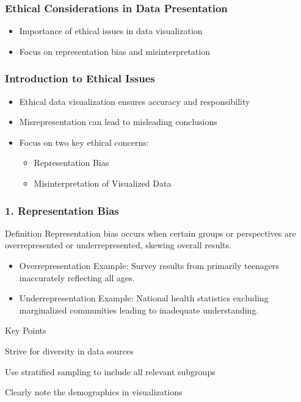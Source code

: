 \documentclass[aspectratio=169]{beamer}
\begin{document}
\begin{frame}[fragile]
    \frametitle{Ethical Considerations in Data Presentation}
    \begin{itemize}
        \item Importance of ethical issues in data visualization
        \item Focus on representation bias and misinterpretation
    \end{itemize}
\end{frame}

\begin{frame}[fragile]
    \frametitle{Introduction to Ethical Issues}
    \begin{itemize}
        \item Ethical data visualization ensures accuracy and responsibility
        \item Misrepresentation can lead to misleading conclusions
        \item Focus on two key ethical concerns:
            \begin{itemize}
                \item Representation Bias
                \item Misinterpretation of Visualized Data
            \end{itemize}
    \end{itemize}
\end{frame}

\begin{frame}[fragile]
    \frametitle{1. Representation Bias}
    \begin{block}{Definition}
        Representation bias occurs when certain groups or perspectives are overrepresented or underrepresented, skewing overall results.
    \end{block}
    \begin{itemize}
        \item Overrepresentation Example: Survey results from primarily teenagers inaccurately reflecting all ages.
        \item Underrepresentation Example: National health statistics excluding marginalized communities leading to inadequate understanding.
    \end{itemize}
    \begin{block}{Key Points}
        \item Strive for diversity in data sources
        \item Use stratified sampling to include all relevant subgroups
        \item Clearly note the demographics in visualizations
    \end{block}
\end{frame}
\end{document}
